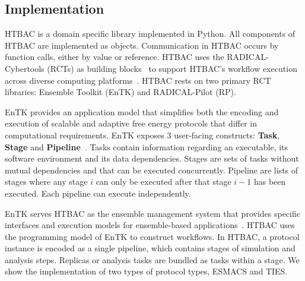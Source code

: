 

\subsection{Implementation}


HTBAC is a domain specific library implemented in Python. All components of
HTBAC are implemented as objects. Communication in HTBAC occurs by function
calls, either by value or reference. HTBAC uses the RADICAL-Cybertools (RCTs) as 
building blocks~\cite{review_bb_2016} to support HTBAC's workflow execution 
across diverse computing platforms~\cite{turilli2017comprehensive}. HTBAC rests 
on two primary RCT libraries: Ensemble Toolkit (EnTK) and RADICAL-Pilot (RP).

EnTK provides an application model that simplifies both the encoding and
execution of scalable and adaptive free energy protocols that differ in
computational requirements. EnTK exposes 3 user-facing constructs:
\textbf{Task}, \textbf{Stage} and \textbf{Pipeline}~\cite{power-of-many17}.
Tasks contain information regarding an executable, its software environment
and its data dependencies. Stages are sets of tasks without mutual
dependencies and that can be executed concurrently. Pipeline are lists of
stages where any stage $i$ can only be executed after that stage $i - 1$ has
been executed. Each pipeline can execute independently.

EnTK serves HTBAC as the ensemble management system that provides specific
interfaces and execution models for ensemble-based
applications~\cite{power-of-many17}. HTBAC uses the programming model of EnTK
to construct workflows. In HTBAC, a protocol instance is encoded as a single
pipeline, which contains stages of simulation and analysis steps. Replicas or
analysis tasks are bundled as tasks within a stage. We show the
implementation of two types of protocol types, ESMACS and TIES.

